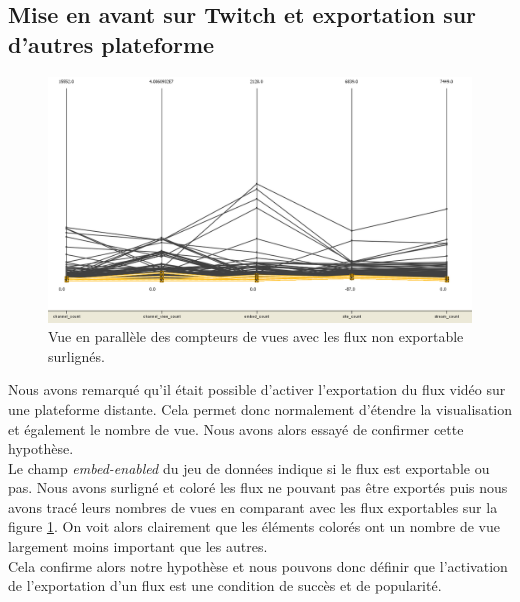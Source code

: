 \documentclass[11pt, a4paper, titlepage]{scrartcl}
\begin{document}
\subsection{Mise en avant sur Twitch et exportation sur d'autres plateforme}
\begin{figure}[h]
    \centering
    \includegraphics[width=\textwidth]{images/embed_enabled_influence}
    \caption{Vue en parallèle des compteurs de vues avec les flux non
    exportable surlignés.}
    \label{fig:embed_enabled_influence}
\end{figure}

Nous avons remarqué qu'il était possible d'activer l'exportation du flux vidéo
sur une plateforme distante. Cela permet donc normalement d'étendre la
visualisation et également le nombre de vue. Nous avons alors essayé de
confirmer cette hypothèse. \\

Le champ \textit{embed-enabled} du jeu de données indique si le flux est
exportable ou pas. Nous avons surligné et coloré les flux ne pouvant pas être
exportés puis nous avons tracé leurs nombres de vues en comparant avec les flux
exportables sur la figure \ref{fig:embed_enabled_influence}. On voit alors
clairement que les éléments colorés ont un nombre de vue largement moins
important que les autres. \\

Cela confirme alors notre hypothèse et nous pouvons donc définir que
l'activation de l'exportation d'un flux est une condition de succès et de
popularité. \\
\end{document}
